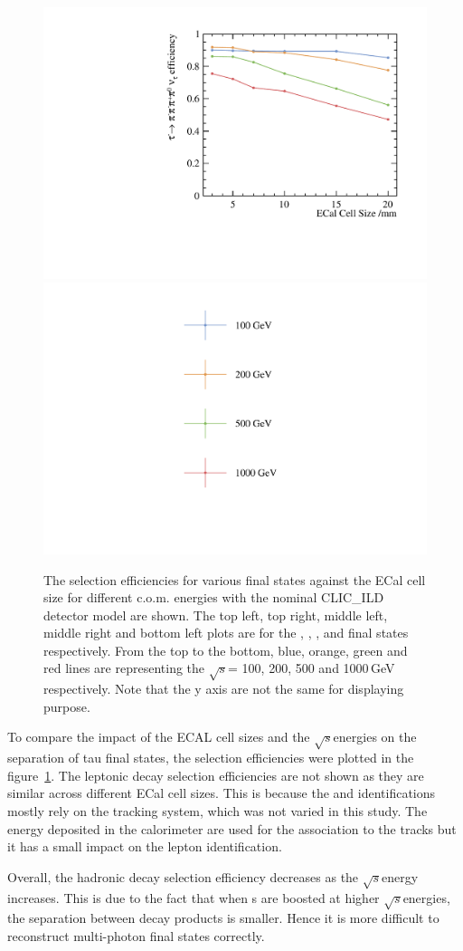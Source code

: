 \documentclass[a4paper,11pt]{article}
\newcommand{\decayPion}{\PGpm\PGnGt}
\newcommand{\decayRho}{\PGrP{\PGpm\PGpz}\PGnGt}
\newcommand{\decayAiPhoton}{\PaDoP{\PGpm\PGpz\PGpz}\PGnGt}
\newcommand{\decayAiPion}{\PaDoP{\PGpm\PGpm\PGpp}\PGnGt}
\newcommand{\decayThreePionPhoton}{\PGpm\PGpm\PGpp\PGnGt}
\newcommand{\rootS}{\ensuremath{\sqrt{s}}}
\begin{document}
\begin{figure}[htbp]
\includegraphics[width=.45\textwidth]{plots/decayMode6}
\qquad
\includegraphics[width=.45\textwidth]{plots/legend}
\caption{\label{fig:pion_efficiency} The selection efficiencies for various final states against the ECal cell size for different c.o.m. energies with the nominal CLIC\_ILD detector model are shown. The top left, top right, middle left, middle right and bottom left plots are for the \decayPion, \decayRho,  \decayAiPhoton, \decayAiPion  and \decayThreePionPhoton  final states respectively. From the top to the bottom, blue, orange, green and red lines are representing the \rootS = 100, 200, 500 and 1000\,GeV respectively. Note that the y axis are not the same for displaying purpose.}
\end{figure}

To compare the impact of the ECAL cell sizes and the \rootS energies on the separation of tau final states, the selection efficiencies were plotted in the figure~\ref{fig:pion_efficiency}. The leptonic decay selection efficiencies are not shown as they are similar across different ECal cell sizes. This is because the \Pepm and \PGmpm identifications mostly rely on the tracking system, which was not varied in this study. The energy deposited in the calorimeter are used for the association to the tracks but it has a small impact on the lepton identification. 

Overall, the hadronic decay selection efficiency decreases as the \rootS energy increases. This is due to the fact that when {\PGt}s are boosted at higher \rootS energies, the separation between decay products is smaller. Hence it is more difficult to reconstruct multi-photon final states correctly.
\end{document}
